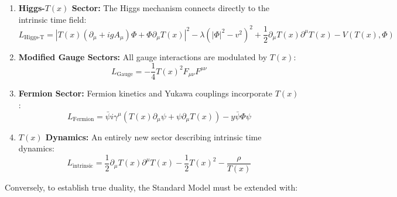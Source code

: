 \documentclass[12pt,a4paper]{article}
\newcommand{\Tfield}{T(x)}
\begin{document}
	\begin{enumerate}
		\item \textbf{Higgs-$\Tfield$ Sector:} The Higgs mechanism connects directly to the intrinsic time field:
		\begin{equation}
			L_{\text{Higgs-T}} = |T(x)(\partial_{\mu} + igA_{\mu})\Phi + \Phi\partial_{\mu}T(x)|^2 - \lambda(|\Phi|^2 - v^2)^2 + \frac{1}{2}\partial_{\mu}T(x)\partial^{\mu}T(x) - V(T(x),\Phi)
		\end{equation}
		
		\item \textbf{Modified Gauge Sectors:} All gauge interactions are modulated by $\Tfield$:
		\begin{equation}
			L_{\text{Gauge}} = -\frac{1}{4}T(x)^2F_{\mu\nu} F^{\mu\nu}
		\end{equation}
		
		\item \textbf{Fermion Sector:} Fermion kinetics and Yukawa couplings incorporate $\Tfield$:
		\begin{equation}
			L_{\text{Fermion}} = \bar{\psi}i\gamma^{\mu}(T(x)\partial_{\mu}\psi + \psi\partial_{\mu}T(x)) - y\bar{\psi}\Phi\psi
		\end{equation}
		
		\item \textbf{$\Tfield$ Dynamics:} An entirely new sector describing intrinsic time dynamics:
		\begin{equation}
			L_{\text{intrinsic}} = \frac{1}{2}\partial_{\mu}T(x)\partial^{\mu}T(x) - \frac{1}{2}T(x)^2 - \frac{\rho}{T(x)}
		\end{equation}
	\end{enumerate}
	
	Conversely, to establish true duality, the Standard Model must be extended with:
	
\end{document}
